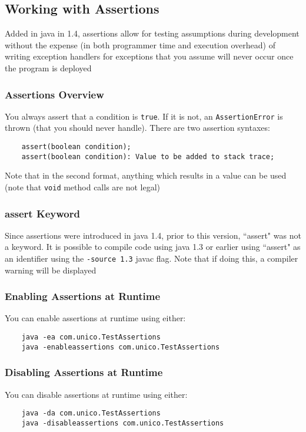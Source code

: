 \subsection{Working with Assertions}
Added in java in 1.4, assertions allow for testing assumptions during 
development without the expense (in both programmer time and execution 
overhead) of writing exception handlers for exceptions that you assume will 
never occur once the program is deployed

\subsubsection{Assertions Overview}
You always assert that a condition is \verb#true#. If it is not, an 
\verb#AssertionError# is thrown (that you should never handle). There are two 
assertion syntaxes:
\begin{verbatim}
    assert(boolean condition);
    assert(boolean condition): Value to be added to stack trace;
\end{verbatim}
Note that in the second format, anything which results in a value can be used 
(note that \verb#void# method calls are not legal)

\subsubsection{assert Keyword}
Since assertions were introduced in java 1.4, prior to this version, ``assert" 
was not a keyword.  It is possible to compile code using java 1.3 or earlier 
using ``assert" as an identifier using the \verb#-source 1.3# javac flag. Note 
that if doing this, a compiler warning will be displayed

\subsubsection{Enabling Assertions at Runtime}
You can enable assertions at runtime using either:
\begin{verbatim}
    java -ea com.unico.TestAssertions
    java -enableassertions com.unico.TestAssertions
\end{verbatim}

\subsubsection{Disabling Assertions at Runtime}
You can disable assertions at runtime using either:
\begin{verbatim}
    java -da com.unico.TestAssertions
    java -disableassertions com.unico.TestAssertions
\end{verbatim}

